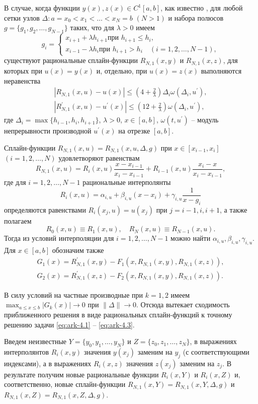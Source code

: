 В случае, когда функции  $y(x), z(x)\in C^1[a,b]$, как известно \cite{bib:ark-11},
 для любой сетки узлов $\Delta: a=x_0<x_1<\dots<x_N=b$  $(N>1)$ и
набора полюсов $g=\{g_1, g_2,\dots, g_{N-1}\}$ таких, что для  $\lambda>0$ имеем
$$
g_i=\begin{cases}
x_{i+1}+\lambda h_{i+1} \text{при } h_{i+1}\leqslant h_i,\\
x_{i-1}-\lambda h_i \text{при } h_{i+1}> h_i \quad (i=1,2,\dots,N-1),
\end{cases}
$$
существуют рациональные сплайн-функции $R_{N,1}(x,y)$ и $R_{N,1}(x,z)$,
 для которых при $u(x)=y(x)$ и, отдельно, при $u(x)=z(x)$ выполняются неравенства
\begin{gather*}\label{eq:ark-4.4}
|R_{N,1}(x,u)-u(x)|\leqslant
\left(4+\frac 2\lambda \right)\Delta_i \omega(\Delta_i,u^\prime),
\\\label{eq:ark-4.5}
|R^\prime_{N,1}(x,u)-u^\prime(x)|\leqslant
\left(12+\frac 2\lambda \right)\omega(\Delta_i,u^\prime),
\end{gather*}
где $\Delta_i=\max\{h_{i-1}, h_i, h_{i+1}\}$, $\lambda >0$, $x\in [a,b]$, $\omega(t, u^\prime)$
-- модуль непрерывности производной $u^\prime (x)$ на отрезке $[a,b]$.

Сплайн-функции $R_{N,1}(x,u)=R_{N,1}(x,u,\Delta,g)$ при $x\in [x_{i-1}, x_i]$
$(i=1,2,\dots,N)$ удовлетворяют равенствам
$$
R_{N,1}(x,u)=R_i(x,u) \frac{x-x_{i-1}}{x_i-x_{i-1}}+
R_{i-1}(x,u)\frac{x_i-x}{x_i-x_{i-1}},
$$
где для $i=1,2,\dots,N-1$ рациональные интерполянты
$$
R_i(x,u)=\alpha_{i,u}+\beta_{i,u} (x-x_i)+\gamma_{i,u} \frac 1{x-g_i}
$$
определяются равенствами $R_i(x_j,u)=u(x_j)$  при $j=i-1, i, i+1$, а также полагаем
$$
R_0(x,u)\equiv R_1(x,u),\quad R_N(x,u)\equiv R_{N-1}(x,u).
$$
Тогда из условий интерполяции для $i=1,2,\dots, N-1$ можно найти
$\alpha_{i,u}, \beta_{i,u}, \gamma_{i,u}$.
Для $x\in[a,b]$ обозначим также
\begin{gather*}
  G_1(x)=R_{N,1}^\prime(x,y)-F_1(x, R_{N,1}(x,y),R_{N,1}(x,z)),
  \\
  G_2(x)=R_{N,1}^\prime(x,z)-F_2(x, R_{N,1}(x,y),R_{N,1}(x,z)).
\end{gather*}

В силу условий на частные производные при $k=1,2$ имеем
$\max_{a\leqslant x \leqslant b} |G_k(x)|\to 0$ при $\|\Delta\| \to 0$.
Отсюда вытекает сходимость приближенного решения в виде рациональных
сплайн-функций к точному решению задачи \eqref{eq:ark-4.1} -- \eqref{eq:ark-4.3}.

Введем неизвестные $Y=\{y_0,y_1, \dots,y_N\}$  и $Z=\{z_0,z_1, \dots, z_N\}$,
 в выражениях интерполянтов $R_i(x,y)$ значения $y(x_j)$ заменим на $y_j$
  (с соответствующими индексами), а в выражениях $R_i(x,z)$ значения $z(x_j)$
  заменим на $z_j$.
В результате получим новые рациональные функции $R_i(x,Y)$ и $R_i(x, Z)$ и,
соответственно, новые сплайн-функции $R_{N,1}(x,Y)=R_{N,1}(x,Y, \Delta,g)$
 и $R_{N,1} (x,Z)=R_{N,1}(x,Z,\Delta, g)$.

